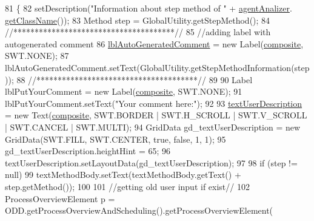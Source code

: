 \begin{DoxyCode}
81                                   \{
82         setDescription(\textcolor{stringliteral}{"Information about step method of "} + \hyperlink{classit_1_1isislab_1_1masonhelperdocumentation_1_1mason_1_1wizards_1_1_l___step_method_page_a0e0b633d8d346100b6ab65b05d9d60e6}{agentAnalizer}.
      \hyperlink{classit_1_1isislab_1_1masonhelperdocumentation_1_1analizer_1_1_agent_analizer_ace466e16439878a851eb63d5a11ddf43}{getClassName}());
83         Method step = GlobalUtility.getStepMethod();
84         \textcolor{comment}{//**************************************//}
85         \textcolor{comment}{//adding label with autogenerated comment}
86         \hyperlink{classit_1_1isislab_1_1masonhelperdocumentation_1_1mason_1_1wizards_1_1_l___step_method_page_af9b2ba2f488b5e92c1e8745127d3162c}{lblAutoGeneratedComment} = \textcolor{keyword}{new} Label(\hyperlink{classit_1_1isislab_1_1masonhelperdocumentation_1_1mason_1_1wizards_1_1_l___step_method_page_a73ff4ee05e8c5b36aed06fa604e32ac2}{composite}, SWT.NONE);
87         lblAutoGeneratedComment.setText(GlobalUtility.getStepMethodInformation(step));
88         \textcolor{comment}{//**************************************//}
89         
90         Label lblPutYourComment = \textcolor{keyword}{new} Label(\hyperlink{classit_1_1isislab_1_1masonhelperdocumentation_1_1mason_1_1wizards_1_1_l___step_method_page_a73ff4ee05e8c5b36aed06fa604e32ac2}{composite}, SWT.NONE);
91         lblPutYourComment.setText(\textcolor{stringliteral}{"Your comment here:"});
92         
93         \hyperlink{classit_1_1isislab_1_1masonhelperdocumentation_1_1mason_1_1wizards_1_1_l___step_method_page_a7cb65b64022898b986f913f4a7ae43d3}{textUserDescription} = \textcolor{keyword}{new} Text(\hyperlink{classit_1_1isislab_1_1masonhelperdocumentation_1_1mason_1_1wizards_1_1_l___step_method_page_a73ff4ee05e8c5b36aed06fa604e32ac2}{composite}, SWT.BORDER | SWT.H\_SCROLL | 
      SWT.V\_SCROLL | SWT.CANCEL | SWT.MULTI);
94         GridData gd\_textUserDescription = \textcolor{keyword}{new} GridData(SWT.FILL, SWT.CENTER, \textcolor{keyword}{true}, \textcolor{keyword}{false}, 1, 1);
95         gd\_textUserDescription.heightHint = 65;
96         textUserDescription.setLayoutData(gd\_textUserDescription);
97         
98         \textcolor{keywordflow}{if} (step != null)
99             textMethodBody.setText(textMethodBody.getText() +  step.getMethod());       
100 
101         \textcolor{comment}{//getting old user input if exist//}
102         ProcessOverviewElement p = ODD.getProcessOverviewAndScheduling().getProcessOverviewElement(

\end{DoxyCode}
